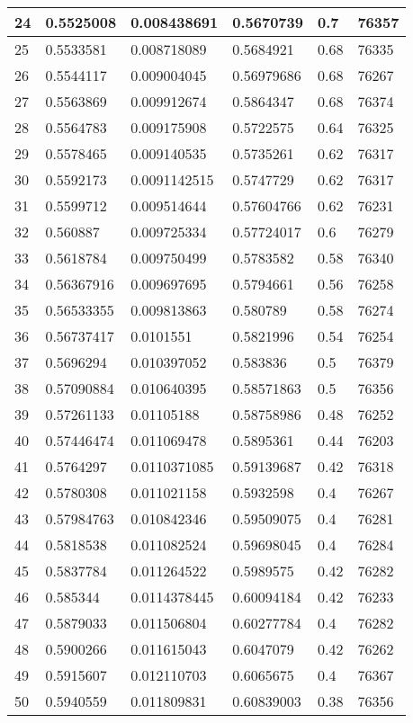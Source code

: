 \begin{longtable}{|l|l|l|l|l|l|}
24 & 0.5525008 & 0.008438691 & 0.5670739 & 0.7 & 76357 \\ \hline 
25 & 0.5533581 & 0.008718089 & 0.5684921 & 0.68 & 76335 \\ \hline 
26 & 0.5544117 & 0.009004045 & 0.56979686 & 0.68 & 76267 \\ \hline 
27 & 0.5563869 & 0.009912674 & 0.5864347 & 0.68 & 76374 \\ \hline 
28 & 0.5564783 & 0.009175908 & 0.5722575 & 0.64 & 76325 \\ \hline 
29 & 0.5578465 & 0.009140535 & 0.5735261 & 0.62 & 76317 \\ \hline 
30 & 0.5592173 & 0.0091142515 & 0.5747729 & 0.62 & 76317 \\ \hline 
31 & 0.5599712 & 0.009514644 & 0.57604766 & 0.62 & 76231 \\ \hline 
32 & 0.560887 & 0.009725334 & 0.57724017 & 0.6 & 76279 \\ \hline 
33 & 0.5618784 & 0.009750499 & 0.5783582 & 0.58 & 76340 \\ \hline 
34 & 0.56367916 & 0.009697695 & 0.5794661 & 0.56 & 76258 \\ \hline 
35 & 0.56533355 & 0.009813863 & 0.580789 & 0.58 & 76274 \\ \hline 
36 & 0.56737417 & 0.0101551 & 0.5821996 & 0.54 & 76254 \\ \hline 
37 & 0.5696294 & 0.010397052 & 0.583836 & 0.5 & 76379 \\ \hline 
38 & 0.57090884 & 0.010640395 & 0.58571863 & 0.5 & 76356 \\ \hline 
39 & 0.57261133 & 0.01105188 & 0.58758986 & 0.48 & 76252 \\ \hline 
40 & 0.57446474 & 0.011069478 & 0.5895361 & 0.44 & 76203 \\ \hline 
41 & 0.5764297 & 0.0110371085 & 0.59139687 & 0.42 & 76318 \\ \hline 
42 & 0.5780308 & 0.011021158 & 0.5932598 & 0.4 & 76267 \\ \hline 
43 & 0.57984763 & 0.010842346 & 0.59509075 & 0.4 & 76281 \\ \hline 
44 & 0.5818538 & 0.011082524 & 0.59698045 & 0.4 & 76284 \\ \hline 
45 & 0.5837784 & 0.011264522 & 0.5989575 & 0.42 & 76282 \\ \hline 
46 & 0.585344 & 0.0114378445 & 0.60094184 & 0.42 & 76233 \\ \hline 
47 & 0.5879033 & 0.011506804 & 0.60277784 & 0.4 & 76282 \\ \hline 
48 & 0.5900266 & 0.011615043 & 0.6047079 & 0.42 & 76262 \\ \hline 
49 & 0.5915607 & 0.012110703 & 0.6065675 & 0.4 & 76367 \\ \hline 
50 & 0.5940559 & 0.011809831 & 0.60839003 & 0.38 & 76356 \\ \hline 
\end{longtable}